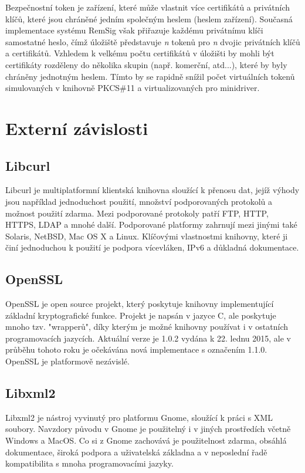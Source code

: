 \documentclass[]{fithesis3}
\begin{document}
	Bezpečnostní token je zařízení, které může vlastnit více certifikátů a privátních klíčů, které jsou 		chráněné jedním společným heslem (heslem zařízení). Současná implementace systému RemSig 		však přiřazuje každému privátnímu klíči samostatné heslo, čímž úložiště představuje \textit{n} 		tokenů pro \textit{n} dvojic privátních klíčů a certifikátů. Vzhledem k velkému počtu certifikátů v 	úložišti by mohli být certifikáty rozděleny do několika skupin (např. komerční, atd...), které by 		byly chráněny jednotným heslem. Tímto by se rapidně snížil počet virtuálních tokenů 				simulovaných v knihovně PKCS\#11 a virtualizovaných pro minidriver.
	
	\section{Externí závislosti}
		\subsection{Libcurl}
		Libcurl je multiplatformní klientská knihovna sloužící k přenosu dat, jejíž výhody jsou 				například jednoduchost použití, množství podporovaných protokolů a možnost použití 				zdarma.  Mezi podporované protokoly patří FTP, HTTP, HTTPS, LDAP a mnohé další. 				Podporované platformy zahrnují mezi jinými také Solaris, NetBSD, Mac OS X a Linux. 				Klíčovými vlastnostmi knihovny, které ji činí jednoduchou k použití je podpora vícevláken, 			IPv6 a důkladná dokumentace.
		\subsection{OpenSSL}
		OpenSSL je open source projekt, který poskytuje knihovny implementující základní 				kryptografické funkce. Projekt je napsán v jazyce C, ale poskytuje mnoho tzv. "wrapperů", 			díky kterým je možné knihovny používat i v ostatních programovacích jazycích. Aktuální 			verze je 1.0.2 vydána k 22. lednu 2015, ale v průběhu tohoto roku je očekávána nová 			implementace s označením 1.1.0. OpenSSL je platformově nezávislé.
		\subsection{Libxml2}		
		Libxml2 je nástroj vyvinutý pro platformu Gnome, sloužící k práci s XML soubory. Navzdory 		původu v Gnome je použitelný i v jiných prostředích včetně Windows a MacOS. Co si z 				Gnome zachovává je použitelnost zdarma, obsáhlá dokumentace, široká podpora a 				uživatelská základna a v neposlední řadě kompatibilita s mnoha programovacími jazyky.
\end{document}
